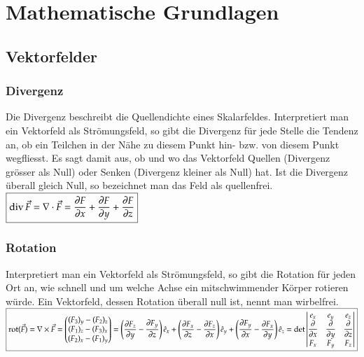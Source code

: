 \section{Mathematische Grundlagen}
\subsection{Vektorfelder }
\subsubsection{Divergenz }
	Die Divergenz beschreibt die Quellendichte eines Skalarfeldes. 
	Interpretiert man ein Vektorfeld als Strömungsfeld, so gibt die Divergenz für jede
	Stelle die Tendenz an, ob ein Teilchen in der Nähe zu diesem Punkt hin- bzw.
	von diesem Punkt wegfliesst. Es sagt damit aus, ob und wo das Vektorfeld Quellen
	(Divergenz grösser als Null) oder Senken (Divergenz kleiner als Null) hat. Ist
	die Divergenz überall gleich Null, so bezeichnet man das Feld als quellenfrei.\\
	
	$\boxed{\operatorname{div} \vec{F}=\nabla \cdot \vec{F}= \frac{\partial F}{\partial x}+\frac{\partial F}{\partial y}+\frac{\partial F}{\partial z}}$

\subsubsection{Rotation }
Interpretiert man ein Vektorfeld als Strömungsfeld, so gibt die Rotation für jeden
Ort an, wie schnell und um welche Achse ein mitschwimmender Körper rotieren
würde. Ein Vektorfeld, dessen Rotation überall null ist, nennt man wirbelfrei.\\

$\boxed{\operatorname{rot}(\vec F)=\nabla\times\vec{F} = 
	\begin{pmatrix}
	(F_3)_y - (F_2)_z\\
	(F_1)_z - (F_3)_x\\
	(F_2)_x - (F_1)_y
	\end{pmatrix} = \left({\frac {\partial F_{z}}{\partial y}}-{\frac {\partial F_{y}}{\partial z}}\right){\hat {e}}_{x}+\left({\frac {\partial F_{x}}{\partial z}}-{\frac {\partial F_{z}}{\partial x}}\right){\hat {e}}_{y}+\left({\frac {\partial F_{y}}{\partial x}}-{\frac {\partial F_{x}}{\partial y}}\right){\hat {e}}_{z} =
	\det
	\begin{vmatrix}
	e_x & e_y&e_z\\
	\dfrac{\partial}{\partial x} & \dfrac{\partial}{\partial y}& \dfrac{\partial}{\partial z}\\
	F_x& F_y & F_z
	\end{vmatrix}}$

